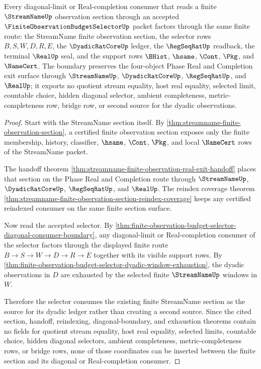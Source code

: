 \begin{theorem}
\label{thm:streamname-finite-observation-diagonal-selector-boundary}
Every diagonal-limit or Real-completion consumer that reads a finite
$\StreamNameUp$ observation section through an accepted
$\FiniteObservationBudgetSelectorUp$ packet factors through the same finite
route: the StreamName finite observation section, the selector rows
$B,S,W,D,R,E$, the $\DyadicRatCoreUp$ ledger, the $\RegSeqRatUp$ readback, the
terminal $\RealUp$ seal, and the support rows $\BHist$, $\hsame$, $\Cont$,
$\Pkg$, and $\NameCert$. The boundary preserves the four-object Phase Real and
Completion exit surface through $\StreamNameUp$, $\DyadicRatCoreUp$,
$\RegSeqRatUp$, and $\RealUp$; it exports no quotient stream equality, host
real equality, selected limit, countable choice, hidden diagonal selector,
ambient completeness, metric-completeness row, bridge row, or second source for
the dyadic observations.
\end{theorem}
\begin{proof}
Start with the StreamName section itself. By
\autoref{thm:streamname-finite-observation-section}, a certified finite
observation section exposes only the finite membership, history, classifier,
$\hsame$, $\Cont$, $\Pkg$, and local $\NameCert$ rows of the StreamName packet.

The handoff theorem
\autoref{thm:streamname-finite-observation-real-exit-handoff} places that
section on the Phase Real and Completion route through $\StreamNameUp$,
$\DyadicRatCoreUp$, $\RegSeqRatUp$, and $\RealUp$. The reindex coverage theorem
\autoref{thm:streamname-finite-observation-section-reindex-coverage} keeps any
certified reindexed consumer on the same finite section surface.

Now read the accepted selector. By
\autoref{thm:finite-observation-budget-selector-diagonal-consumer-boundary},
any diagonal-limit or Real-completion consumer of the selector factors through
the displayed finite route $B \to S \to W \to D \to R \to E$ together with its
visible support rows. By
\autoref{thm:finite-observation-budget-selector-dyadic-window-exhaustion}, the
dyadic observations in $D$ are exhausted by the selected finite
$\StreamNameUp$ windows in $W$.

Therefore the selector consumes the existing finite StreamName section as the
source for its dyadic ledger rather than creating a second source. Since the
cited section, handoff, reindexing, diagonal-boundary, and exhaustion theorems
contain no fields for quotient stream equality, host real equality, selected
limits, countable choice, hidden diagonal selectors, ambient completeness,
metric-completeness rows, or bridge rows, none of those coordinates can be
inserted between the finite section and its diagonal or Real-completion
consumer.
\end{proof}

